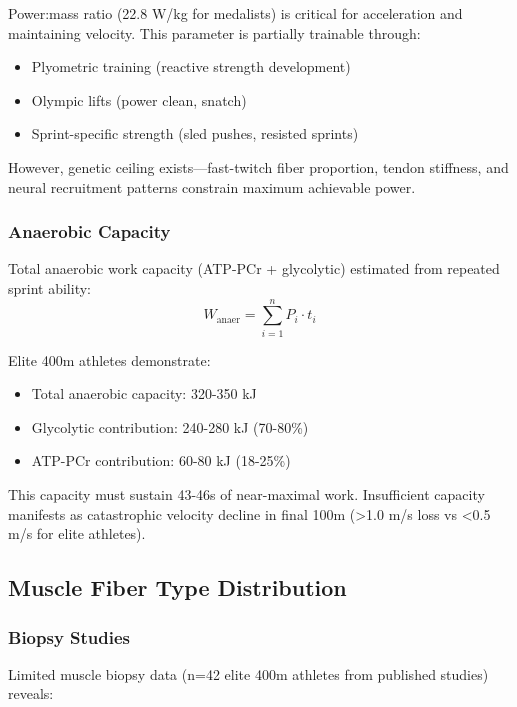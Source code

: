 Power:mass ratio (22.8 W/kg for medalists) is critical for acceleration and maintaining velocity. This parameter is partially trainable through:
\begin{itemize}
    \item Plyometric training (reactive strength development)
    \item Olympic lifts (power clean, snatch)
    \item Sprint-specific strength (sled pushes, resisted sprints)
\end{itemize}

However, genetic ceiling exists—fast-twitch fiber proportion, tendon stiffness, and neural recruitment patterns constrain maximum achievable power.

\subsubsection{Anaerobic Capacity}

Total anaerobic work capacity (ATP-PCr + glycolytic) estimated from repeated sprint ability:
\begin{equation}
W_{\text{anaer}} = \sum_{i=1}^{n} P_i \cdot t_i
\end{equation}

Elite 400m athletes demonstrate:
\begin{itemize}
    \item Total anaerobic capacity: 320-350 kJ
    \item Glycolytic contribution: 240-280 kJ (70-80\%)
    \item ATP-PCr contribution: 60-80 kJ (18-25\%)
\end{itemize}

This capacity must sustain 43-46s of near-maximal work. Insufficient capacity manifests as catastrophic velocity decline in final 100m (>1.0 m/s loss vs <0.5 m/s for elite athletes).

\subsection{Muscle Fiber Type Distribution}

\subsubsection{Biopsy Studies}

Limited muscle biopsy data (n=42 elite 400m athletes from published studies) reveals:

